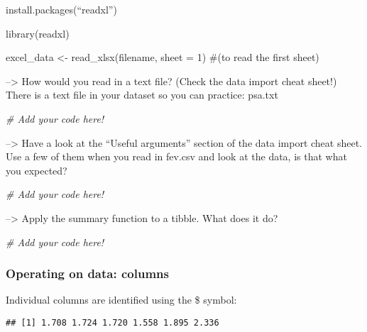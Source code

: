\documentclass[
]{article}
\newenvironment{Shaded}{\begin{snugshade}}{\end{snugshade}}
\newcommand{\CommentTok}[1]{\textcolor[rgb]{0.56,0.35,0.01}{\textit{#1}}}
\newcommand{\FunctionTok}[1]{\textcolor[rgb]{0.13,0.29,0.53}{\textbf{#1}}}
\newcommand{\NormalTok}[1]{#1}
\newcommand{\SpecialCharTok}[1]{\textcolor[rgb]{0.81,0.36,0.00}{\textbf{#1}}}
\begin{document}
install.packages(``readxl'')

library(readxl)

excel\_data \textless- read\_xlsx(filename, sheet = 1) \#(to read the
first sheet)

--\textgreater{} How would you read in a text file? (Check the data
import cheat sheet!) There is a text file in your dataset so you can
practice: psa.txt

\begin{Shaded}
\begin{Highlighting}[]
\CommentTok{\# Add your code here!}
\end{Highlighting}
\end{Shaded}

--\textgreater{} Have a look at the ``Useful arguments'' section of the
data import cheat sheet. Use a few of them when you read in fev.csv and
look at the data, is that what you expected?

\begin{Shaded}
\begin{Highlighting}[]
\CommentTok{\# Add your code here!}
\end{Highlighting}
\end{Shaded}

--\textgreater{} Apply the summary function to a tibble. What does it
do?

\begin{Shaded}
\begin{Highlighting}[]
\CommentTok{\# Add your code here!}
\end{Highlighting}
\end{Shaded}

\subsubsection{Operating on data:
columns}\label{operating-on-data-columns}

Individual columns are identified using the \$ symbol:

\begin{Shaded}
\end{Shaded}

\begin{verbatim}
## [1] 1.708 1.724 1.720 1.558 1.895 2.336
\end{verbatim}
\end{document}
